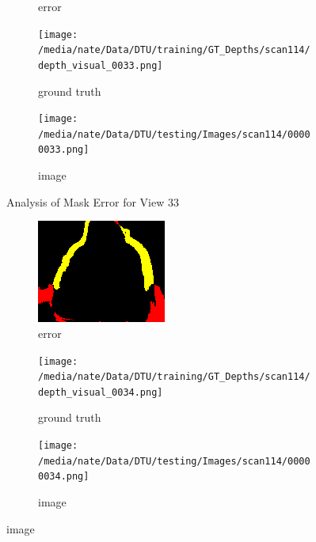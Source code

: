 \documentclass{article}
\begin{document}
\begin{figure}
\begin{subfigure}{0.3\textwidth}
		\caption{error}
		\label{fig:error33}
	\end{subfigure}
	\hfill
	\centering
	\begin{subfigure}{0.3\textwidth}
		\centering
		\texttt{[image: /media/nate/Data/DTU/training/GT\_Depths/scan114/depth\_visual\_0033.png]}
		\caption{ground truth}
		\label{fig:gt33}
	\end{subfigure}
	\hfill
	\centering
	\begin{subfigure}{0.3\textwidth}
		\centering
		\texttt{[image: /media/nate/Data/DTU/testing/Images/scan114/00000033.png]}
		\caption{image}
		\label{fig:img33}
	\end{subfigure}
	\hfill
	\caption{Analysis of Mask Error for View 33}
	\label{fig:error_analys33}
\end{figure}\begin{figure}
	\centering
	\begin{subfigure}{0.3\textwidth}
		\centering
		\includegraphics[width=\textwidth]{./output/034_error.png}
		\caption{error}
		\label{fig:error34}
	\end{subfigure}
	\hfill
	\centering
	\begin{subfigure}{0.3\textwidth}
		\centering
		\texttt{[image: /media/nate/Data/DTU/training/GT\_Depths/scan114/depth\_visual\_0034.png]}
		\caption{ground truth}
		\label{fig:gt34}
	\end{subfigure}
	\hfill
	\centering
	\begin{subfigure}{0.3\textwidth}
		\centering
		\texttt{[image: /media/nate/Data/DTU/testing/Images/scan114/00000034.png]}
		\caption{image}

\end{subfigure}
\end{figure}
\end{document}
